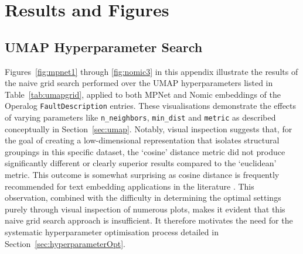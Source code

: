 \documentclass[10pt,oneside]{report}
\begin{document}
\appendix

\chapter{Results and Figures}



\section{UMAP Hyperparameter Search} \label{app:umaphypgrid}
Figures~\ref{fig:mpnet1} through \ref{fig:nomic3} in this appendix illustrate the results of the naive grid search performed over the UMAP hyperparameters listed in Table~\ref{tab:umapgrid}, applied to both MPNet and Nomic embeddings of the Operalog \texttt{FaultDescription} entries. These visualisations demonstrate the effects of varying parameters like \texttt{n\_neighbors}, \texttt{min\_dist} and \texttt{metric} as described conceptually in Section~\ref{sec:umap}. Notably, visual inspection suggests that, for the goal of creating a low-dimensional representation that isolates structural groupings in this specific dataset, the `cosine' distance metric did not produce significantly different or clearly superior results compared to the `euclidean' metric. This outcome is somewhat surprising as cosine distance is frequently recommended for text embedding applications in the literature \cite{cao2024recent, baba2017plagiarism}. This observation, combined with the difficulty in determining the optimal settings purely through visual inspection of numerous plots, makes it evident that this naive grid search approach is insufficient. It therefore motivates the need for the systematic hyperparameter optimisation process detailed in Section~\ref{sec:hyperparameterOpt}.
\end{document}
